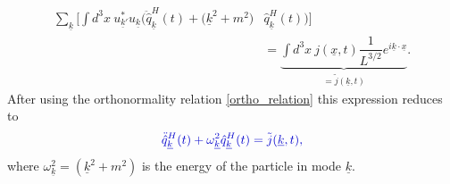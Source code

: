 \documentclass[
12pt, %
english, %
singlespacing, %
headsepline, %
]{MastersDoctoralThesis} %
\begin{document}
\begin{equation}
\begin{split}
 \sum_{\underline{k}}
 \Big[ 
 \int d^{3}x \ u^{\ast}_{\underline{k}'}u_{\underline{k}}
 \Big( 
 \ddot{\hat{q}}^{H}_{\underline{k}}(t) 
 +
 \Big( \underline{k}^{2}+m^{2}
 \Big) 
 &\hat{q}^{H}_{\underline{k}}(t) 
 \Big) 
  \Big] 
  \\
  &=
  {\underbrace{\int d^{3}x \ 
j(\underline{x},t) \dfrac{1}{L^{3/2}} e^{i\underline{k}\cdot\underline{x}}}_{=\tilde{j}(\underline{k},t)}}
  .
  \end{split}
\end{equation}
After using the orthonormality relation \eqref{ortho_relation} this expression reduces to
\begin{equation}\label{eq_for_q}
 \textcolor[RGB]{0,0,204}{
\ddot{\hat{q}}^{H}_{\underline{k}}(t) 
 +
\omega_{\underline{k}}^{2}
 \hat{q}^{H}_{\underline{k}}(t) 
  =\tilde{j}(\underline{k},t)
  ,}
\end{equation}
where  $ \omega_{\underline{k}}^{2} = (\underline{k}^{2}+m^{2})  $ is the energy of the particle in mode $ \underline{k} $.
\end{document}
